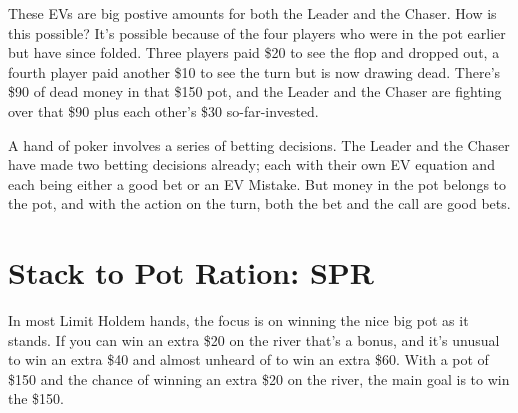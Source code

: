 These EVs are big postive amounts for both the Leader and the
Chaser. How is this possible? It's possible because of the four
players who were in the pot earlier but have since folded. Three
players paid \$20 to see the flop and dropped out, a fourth player
paid another \$10 to see the turn but is now drawing dead. There's
\$90 of dead money in that \$150 pot, and the Leader and the Chaser
are fighting over that \$90 plus each other's \$30 so-far-invested.

A hand of poker involves a series of betting decisions. The Leader and
the Chaser have made two betting decisions already; each with their
own EV equation and each being either a good bet or an EV Mistake. But
money in the pot belongs to the pot, and with the action on the turn,
both the bet and the call are good bets.

\section{Stack to Pot Ration: SPR}

In most Limit Holdem hands, the focus is on winning the nice big pot
as it stands. If you can win an extra \$20 on the river that's a
bonus, and it's unusual to win an extra \$40 and almost unheard of to
win an extra \$60. With a pot of \$150 and the chance of winning an
extra \$20 on the river, the main goal is to win the \$150.


